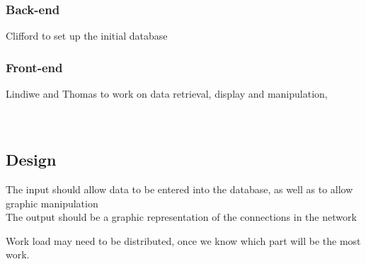 \documentclass[11pt]{article}
\begin{document}
\subsubsection{Back-end}
Clifford to set up the initial database
\subsubsection{Front-end}
Lindiwe and Thomas to work on data retrieval, display and manipulation, 
\\
\\
\\

\subsection{Design}
The input should allow data to be entered into the database, as well as to allow graphic manipulation\\
The output should be a graphic representation of the connections in the network


Work load may need to be distributed, once we know which part will be the most work.
\end{document}
